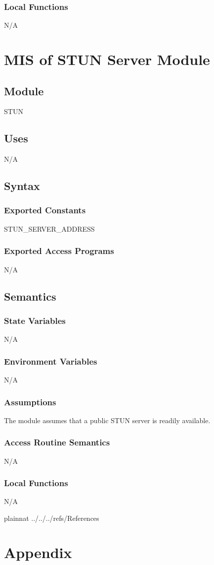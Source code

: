 \documentclass[12pt, titlepage]{article}
\begin{document}
\subsubsection{Local Functions}
N/A

\section{MIS of STUN Server Module} \label{sec:stunserver}

\subsection{Module}
STUN

\subsection{Uses}
N/A

\subsection{Syntax}

\subsubsection{Exported Constants}
STUN\_SERVER\_ADDRESS

\subsubsection{Exported Access Programs}
N/A

\subsection{Semantics}

\subsubsection{State Variables}
N/A

\subsubsection{Environment Variables}
N/A

\subsubsection{Assumptions}
The module assumes that a public STUN server is readily available.

\subsubsection{Access Routine Semantics}
N/A

\subsubsection{Local Functions}
N/A

\newpage

 {plainnat}
 {../../../refs/References}

\newpage

\section{Appendix} \label{Appendix}

\end{document}
